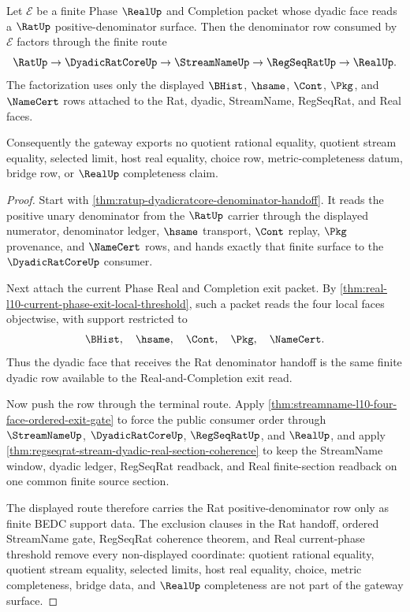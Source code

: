 \begin{theorem}
\label{thm:ratup-l10-dyadic-denominator-gateway}
Let $\mathcal E$ be a finite Phase $\RealUp$ and Completion packet whose
dyadic face reads a $\RatUp$ positive-denominator surface. Then the
denominator row consumed by $\mathcal E$ factors through the finite route
$$
\RatUp \to \DyadicRatCoreUp \to \StreamNameUp \to \RegSeqRatUp \to \RealUp .
$$
The factorization uses only the displayed $\BHist$, $\hsame$, $\Cont$,
$\Pkg$, and $\NameCert$ rows attached to the Rat, dyadic, StreamName,
RegSeqRat, and Real faces.

Consequently the gateway exports no quotient rational equality, quotient
stream equality, selected limit, host real equality, choice row,
metric-completeness datum, bridge row, or $\RealUp$ completeness claim.
\end{theorem}
\begin{proof}
Start with \autoref{thm:ratup-dyadicratcore-denominator-handoff}. It reads
the positive unary denominator from the $\RatUp$ carrier through the displayed
numerator, denominator ledger, $\hsame$ transport, $\Cont$ replay, $\Pkg$
provenance, and $\NameCert$ rows, and hands exactly that finite surface to the
$\DyadicRatCoreUp$ consumer.

Next attach the current Phase Real and Completion exit packet. By
\autoref{thm:real-l10-current-phase-exit-local-threshold}, such a packet reads
the four local faces objectwise, with support restricted to
$$
\BHist,\quad \hsame,\quad \Cont,\quad \Pkg,\quad \NameCert .
$$
Thus the dyadic face that receives the Rat denominator handoff is the same
finite dyadic row available to the Real-and-Completion exit read.

Now push the row through the terminal route. Apply
\autoref{thm:streamname-l10-four-face-ordered-exit-gate} to force the public
consumer order through $\StreamNameUp$, $\DyadicRatCoreUp$, $\RegSeqRatUp$, and
$\RealUp$, and apply
\autoref{thm:regseqrat-stream-dyadic-real-section-coherence} to keep the
StreamName window, dyadic ledger, RegSeqRat readback, and Real finite-section
readback on one common finite source section.

The displayed route therefore carries the Rat positive-denominator row only as
finite BEDC support data. The exclusion clauses in the Rat handoff, ordered
StreamName gate, RegSeqRat coherence theorem, and Real current-phase threshold
remove every non-displayed coordinate: quotient rational equality, quotient
stream equality, selected limits, host real equality, choice, metric
completeness, bridge data, and $\RealUp$ completeness are not part of the
gateway surface.
\end{proof}
